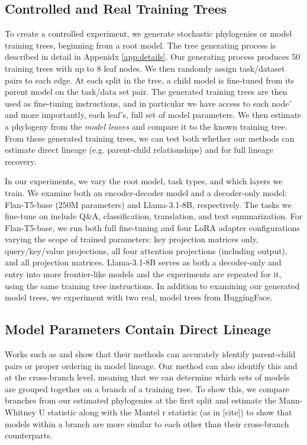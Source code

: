\documentclass{article}
\theoremstyle{definition}
\theoremstyle{plain}
\begin{document}
\subsection*{Controlled and Real Training Trees}
\label{sec:exp:trees}

To create a controlled experiment, we generate stochastic phylogenies or model training trees, beginning from a root model.  The tree generating process is described in detail in Appenidx \ref{app:details}.  Our generating process produces 50 training trees with up to 8 leaf nodes. We then randomly assign task/dataset pairs to each edge. At each split in the tree, a child model is fine-tuned from its parent model on the task/data set pair. The generated training trees are then used as fine-tuning instructions, and in particular we have access to each node' and more importantly, each leaf's,  full set of model parameters.  We then estimate a phylogeny from the \textit{model leaves} and compare it to the known training tree.  From these generated training trees, we can test both whether our methods can estimate direct lineage (e.g. parent-child relationships) and for full lineage recovery.

In our experiments, we vary the root model, task types, and which layers we train. We examine both an encoder-decoder model and a decoder-only model: Flan-T5-base (250M parameters) and Llama-3.1-8B, respectively. The tasks we fine-tune on include Q\&A, classification, translation, and text summarization. For Flan-T5-base, we run both full fine-tuning and four LoRA \citep{hu2022lora} adapter configurations varying the scope of trained parameters: key projection matrices only, query/key/value projections, all four attention projections (including output), and all projection matrices. Llama-3.1-8B serves as both a decoder-only and entry into more frontier-like models and the experiments are repeated for it, using the same training tree instructions. In addition to examining our generated model trees, we experiment with two real, model trees from HuggingFace.

\subsection{Model Parameters Contain Direct Lineage}
Works such as \cite{horwitz2024mother} and \cite{yu2025neural} show that their methods can accurately identify parent-child pairs or proper ordering in model lineage.  Our method can also identify this and at the cross-branch level, meaning that we can determine which sets of models are grouped together on a branch of a training tree.  To show this, we compare branches from our estimated phylogenies at the first split and estimate the Mann-Whitney U statistic along with the Mantel r statistic (as in [cite]) to show that models within a branch are more similar to each other than their cross-branch counterparts.
\end{document}
